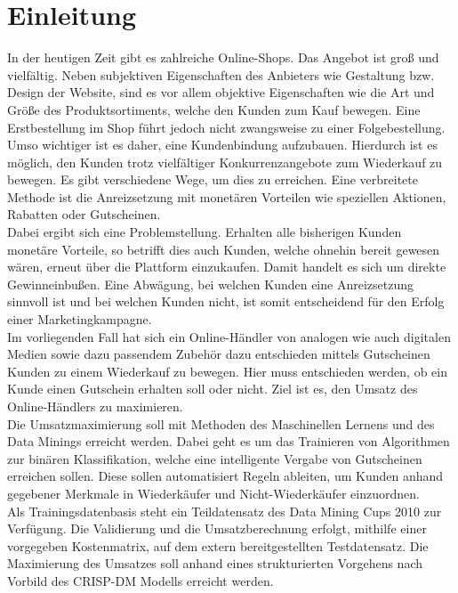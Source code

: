 \chapter{Einleitung}
\label{sec:einleitung}

In der heutigen Zeit gibt es zahlreiche Online-Shops. Das Angebot ist groß und vielfältig. Neben subjektiven Eigenschaften des Anbieters wie Gestaltung bzw. Design der Website, sind es vor allem objektive Eigenschaften wie die Art und Größe des Produktsortiments, welche den Kunden zum Kauf bewegen. Eine Erstbestellung im Shop führt jedoch nicht zwangsweise zu einer Folgebestellung.\\

Umso wichtiger ist es daher, eine Kundenbindung aufzubauen. Hierdurch ist es möglich, den Kunden trotz vielfältiger Konkurrenzangebote zum Wiederkauf zu bewegen.  Es gibt verschiedene Wege, um dies zu erreichen. Eine verbreitete Methode ist die Anreizsetzung mit monetären Vorteilen wie speziellen Aktionen, Rabatten oder Gutscheinen.\\

Dabei ergibt sich eine Problemstellung. Erhalten alle bisherigen Kunden monetäre Vorteile, so betrifft dies auch Kunden, welche ohnehin bereit gewesen wären, erneut über die Plattform einzukaufen. Damit handelt es sich um direkte Gewinneinbußen. Eine Abwägung, bei welchen Kunden eine Anreizsetzung sinnvoll ist und bei welchen Kunden nicht, ist somit entscheidend für den Erfolg einer Marketingkampagne.\\

Im vorliegenden Fall hat sich ein Online-Händler von analogen wie auch digitalen Medien sowie dazu passendem Zubehör dazu entschieden mittels Gutscheinen Kunden zu einem Wiederkauf zu bewegen. Hier muss entschieden werden, ob ein Kunde einen Gutschein erhalten soll oder nicht. Ziel ist es, den Umsatz des Online-Händlers zu maximieren.\\

Die Umsatzmaximierung soll mit Methoden des Maschinellen Lernens und des Data Minings erreicht werden. Dabei geht es um das Trainieren von Algorithmen zur binären Klassifikation, welche eine intelligente Vergabe von Gutscheinen erreichen sollen. Diese sollen automatisiert Regeln ableiten, um Kunden anhand gegebener Merkmale in Wiederkäufer und Nicht-Wiederkäufer einzuordnen.\\ 

Als Trainingsdatenbasis steht ein Teildatensatz des Data Mining Cups 2010 zur Verfügung. Die Validierung und die Umsatzberechnung erfolgt, mithilfe einer vorgegeben Kostenmatrix, auf dem extern bereitgestellten Testdatensatz. Die Maximierung des Umsatzes soll anhand eines strukturierten Vorgehens nach Vorbild des CRISP-DM Modells erreicht werden.\\ 

